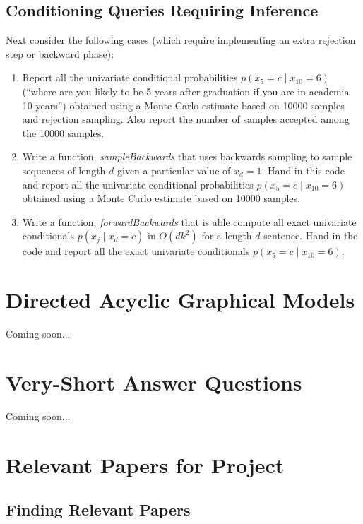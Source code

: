 \documentclass{article}
\def\blu#1{{\color{blu}#1}}
\def\cond{\; | \;}
\def\enum#1{\begin{enumerate}#1\end{enumerate}}
\begin{document}
\subsection{Conditioning Queries Requiring Inference}

Next consider the following cases (which require implementing an extra rejection step or backward phase):
\enum{
\item \blu{Report all the univariate conditional probabilities $p(x_5 = c \cond  x_{10} = 6)$ (``where are you likely to be 5 years after graduation if you are in academia 10 years'') obtained using a Monte Carlo estimate based on 10000 samples and rejection sampling. Also report the number of samples accepted among the 10000 samples.}
\item Write a function, \emph{sampleBackwards} that uses backwards sampling to sample sequences of length $d$ given a particular value of $x_d = 1$. \blu{Hand in this code and report all the univariate conditional probabilities $p(x_5 = c \cond  x_{10} = 6)$ obtained using a Monte Carlo estimate based on 10000 samples}.
\item Write a function, \emph{forwardBackwards} that is able compute all exact univariate conditionals $p(x_j \cond  x_d = c)$ in $O(dk^2)$ for a length-$d$ sentence. \blu{Hand in the code and report all the exact univariate conditionals $p(x_5 = c \cond  x_{10} = 6)$.}
}


\section{Directed Acyclic Graphical Models}

Coming soon...



\section{Very-Short Answer Questions}

Coming soon...



\section{Relevant Papers for Project}

\subsection{Finding Relevant Papers}
\end{document}
